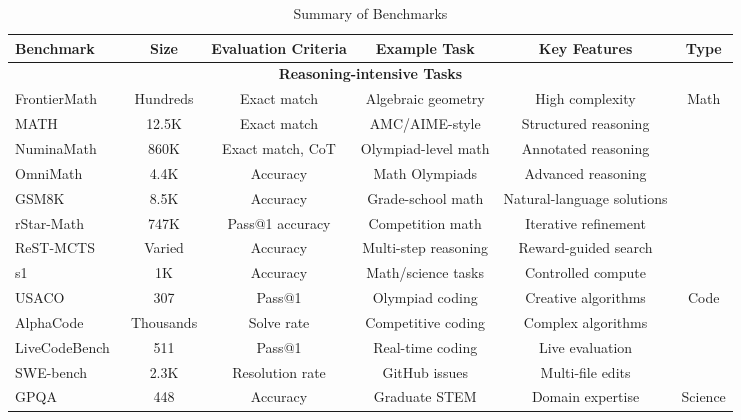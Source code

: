 

\begin{table*}[!ht]
\caption{Summary of Benchmarks}
\label{tab:benchmark-summary-1}
\begin{adjustbox}{width=\textwidth,keepaspectratio}
\begin{tabular}{lccccc}
\toprule
\textbf{Benchmark} & \textbf{Size} & \textbf{Evaluation Criteria} & \textbf{Example Task} & \textbf{Key Features} & \textbf{Type} \\
\midrule
\multicolumn{6}{c}{\textbf{Reasoning-intensive Tasks}} \\
\midrule
FrontierMath~\citep{glazer2024frontiermath} & Hundreds & Exact match & Algebraic geometry & High complexity & \multirow{8}{*}{Math} \\
MATH~\citep{cobbe2021training} & 12.5K & Exact match & AMC/AIME-style & Structured reasoning &  \\
NuminaMath~\citep{numina_math_datasets} & 860K & Exact match, CoT & Olympiad-level math & Annotated reasoning &  \\
OmniMath~\citep{gao2025omnimath} & 4.4K & Accuracy & Math Olympiads & Advanced reasoning &  \\
GSM8K~\citep{zhang2024rest} & 8.5K & Accuracy & Grade-school math & Natural-language solutions &  \\
rStar-Math~\citep{guan2025rstarmath} & 747K & Pass@1 accuracy & Competition math & Iterative refinement &  \\
ReST-MCTS~\citep{zhang2024rest} & Varied & Accuracy & Multi-step reasoning & Reward-guided search &  \\
s1~\citep{muennighoff2025s1} & 1K & Accuracy & Math/science tasks & Controlled compute &  \\
\midrule
USACO~\citep{shi2024can} & 307 & Pass@1 & Olympiad coding & Creative algorithms & \multirow{4}{*}{Code} \\
AlphaCode~\citep{Li2022competition} & Thousands & Solve rate & Competitive coding & Complex algorithms &  \\
LiveCodeBench~\citep{jain2025livecodebench} & 511 & Pass@1 & Real-time coding & Live evaluation &  \\
SWE-bench~\citep{jimenez2024swebench} & 2.3K & Resolution rate & GitHub issues & Multi-file edits &  \\
\midrule
GPQA~\citep{rein2024gpqa} & 448 & Accuracy & Graduate STEM & Domain expertise & \multirow{4}{*}{Science} \\

\end{tabular}
\end{adjustbox}
\end{table*}
